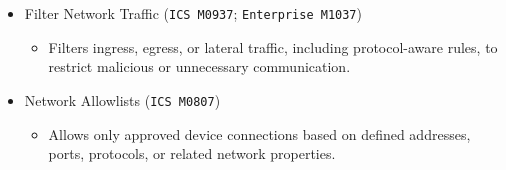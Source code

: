 \documentclass[10pt,a4paper,oneside]{report}
\begin{document}
\begin{itemize}
\begin{itemize}
\begin{itemize}
\item Requires two or more forms of identity evidence before granting access to a system.
\end{itemize}
\item Filter Network Traffic (\texttt{ICS M0937}; \texttt{Enterprise M1037})
\begin{itemize}
\item Filters ingress, egress, or lateral traffic, including protocol-aware rules, to restrict malicious or unnecessary communication.
\end{itemize}
\item Network Allowlists (\texttt{ICS M0807})
\begin{itemize}
\item Allows only approved device connections based on defined addresses, ports, protocols, or related network properties.
\end{itemize}
\end{itemize}
\end{itemize}
\end{document}
